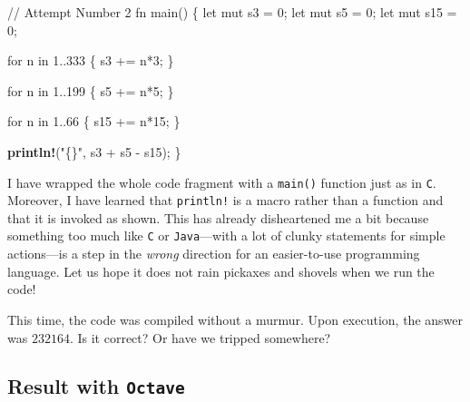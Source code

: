 \documentclass[
  a4paper,
]{article}
\newenvironment{Shaded}{\begin{snugshade}}{\end{snugshade}}
\newcommand{\CommentTok}[1]{\textcolor[rgb]{0.50,0.62,0.50}{#1}}
\newcommand{\ControlFlowTok}[1]{\textcolor[rgb]{0.94,0.87,0.69}{#1}}
\newcommand{\DecValTok}[1]{\textcolor[rgb]{0.86,0.86,0.80}{#1}}
\newcommand{\KeywordTok}[1]{\textcolor[rgb]{0.94,0.87,0.69}{#1}}
\newcommand{\NormalTok}[1]{\textcolor[rgb]{0.80,0.80,0.80}{#1}}
\newcommand{\OperatorTok}[1]{\textcolor[rgb]{0.94,0.94,0.82}{#1}}
\newcommand{\PreprocessorTok}[1]{\textcolor[rgb]{1.00,0.81,0.69}{\textbf{#1}}}
\newcommand{\StringTok}[1]{\textcolor[rgb]{0.80,0.58,0.58}{#1}}
\begin{document}
\begin{Shaded}
\begin{Highlighting}[]
 \CommentTok{// Attempt Number 2}
\KeywordTok{fn}\NormalTok{ main() }\OperatorTok{\{}
    \KeywordTok{let} \KeywordTok{mut}\NormalTok{ s3 }\OperatorTok{=} \DecValTok{0}\OperatorTok{;}
    \KeywordTok{let} \KeywordTok{mut}\NormalTok{ s5 }\OperatorTok{=} \DecValTok{0}\OperatorTok{;}
    \KeywordTok{let} \KeywordTok{mut}\NormalTok{ s15 }\OperatorTok{=} \DecValTok{0}\OperatorTok{;}

    \ControlFlowTok{for}\NormalTok{ n }\KeywordTok{in} \DecValTok{1}\OperatorTok{..}\DecValTok{333} \OperatorTok{\{}
\NormalTok{        s3 }\OperatorTok{+=}\NormalTok{ n}\OperatorTok{*}\DecValTok{3}\OperatorTok{;}
    \OperatorTok{\}}

    \ControlFlowTok{for}\NormalTok{ n }\KeywordTok{in} \DecValTok{1}\OperatorTok{..}\DecValTok{199} \OperatorTok{\{}
\NormalTok{        s5 }\OperatorTok{+=}\NormalTok{ n}\OperatorTok{*}\DecValTok{5}\OperatorTok{;}
    \OperatorTok{\}}

    \ControlFlowTok{for}\NormalTok{ n }\KeywordTok{in} \DecValTok{1}\OperatorTok{..}\DecValTok{66} \OperatorTok{\{}
\NormalTok{        s15 }\OperatorTok{+=}\NormalTok{ n}\OperatorTok{*}\DecValTok{15}\OperatorTok{;}
    \OperatorTok{\}}

    \PreprocessorTok{println!}\NormalTok{(}\StringTok{"\{\}"}\OperatorTok{,}\NormalTok{ s3 }\OperatorTok{+}\NormalTok{ s5 }\OperatorTok{{-}}\NormalTok{ s15)}\OperatorTok{;}
\OperatorTok{\}}
\end{Highlighting}
\end{Shaded}

I have wrapped the whole code fragment with a \texttt{main()} function
just as in \texttt{C}. Moreover, I have learned that \texttt{println!}
is a macro rather than a function and that it is invoked as shown. This
has already disheartened me a bit because something too much like
\texttt{C} or \texttt{Java}---with a lot of clunky statements for simple
actions---is a step in the \emph{wrong} direction for an easier-to-use
programming language. Let us hope it does not rain pickaxes and shovels
when we run the code!

This time, the code was compiled without a murmur. Upon execution, the
answer was \(232164\). Is it correct? Or have we tripped somewhere?

\hypertarget{result-with-octave}{%
\subsection{\texorpdfstring{Result with
\texttt{Octave}}{Result with Octave}}\label{result-with-octave}}
\end{document}
